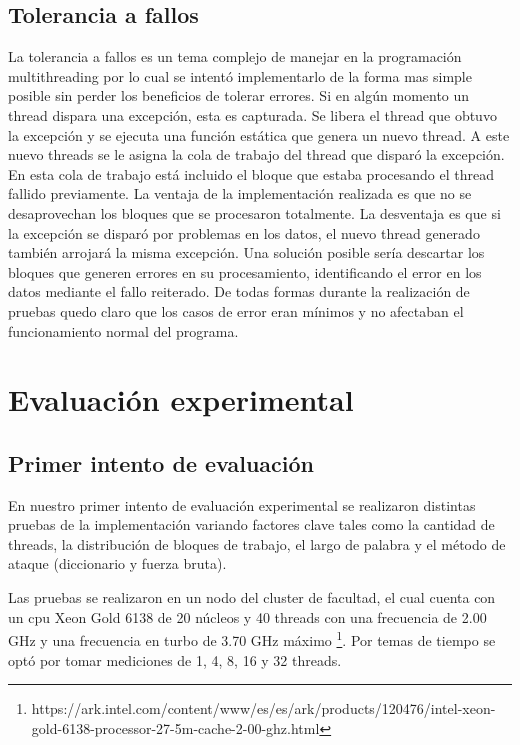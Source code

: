 \documentclass[conference]{IEEEtran}
\begin{document}
\subsection{Tolerancia a fallos}
La tolerancia a fallos es un tema complejo de manejar en la programación multithreading por lo cual se intentó implementarlo de la forma mas simple posible sin perder los beneficios de tolerar errores. Si en algún momento un thread dispara una excepción, esta es capturada. Se libera el thread que obtuvo la excepción y se ejecuta una función estática que genera un nuevo thread. A este nuevo threads se le asigna la cola de trabajo del thread que disparó la excepción. En esta cola de trabajo está incluido el bloque que estaba procesando el thread fallido previamente. La ventaja de la implementación realizada es que no se desaprovechan los bloques que se procesaron totalmente. La desventaja es que si la excepción se disparó por problemas en los datos, el nuevo thread generado también arrojará la misma excepción. Una solución posible sería descartar los bloques que generen errores en su procesamiento, identificando el error en los datos mediante el fallo reiterado. De todas formas durante la realización de pruebas quedo claro que los casos de error eran mínimos y no afectaban el funcionamiento normal del programa.

\section{Evaluación experimental}
\subsection{Primer intento de evaluación}
En nuestro primer intento de evaluación experimental se realizaron distintas pruebas de la implementación variando factores clave tales como la cantidad de threads, la distribución de bloques de trabajo, el largo de palabra y el método de ataque (diccionario y fuerza bruta).

Las pruebas se realizaron en un nodo del cluster de facultad, el cual cuenta con un cpu Xeon Gold 6138 de 20 núcleos y 40 threads con una frecuencia de 2.00 GHz y una frecuencia en turbo de 3.70 GHz máximo \footnote{https://ark.intel.com/content/www/es/es/ark/products/120476/intel-xeon-gold-6138-processor-27-5m-cache-2-00-ghz.html}. Por temas de tiempo se optó por tomar mediciones de 1, 4, 8, 16 y 32 threads.
\end{document}
